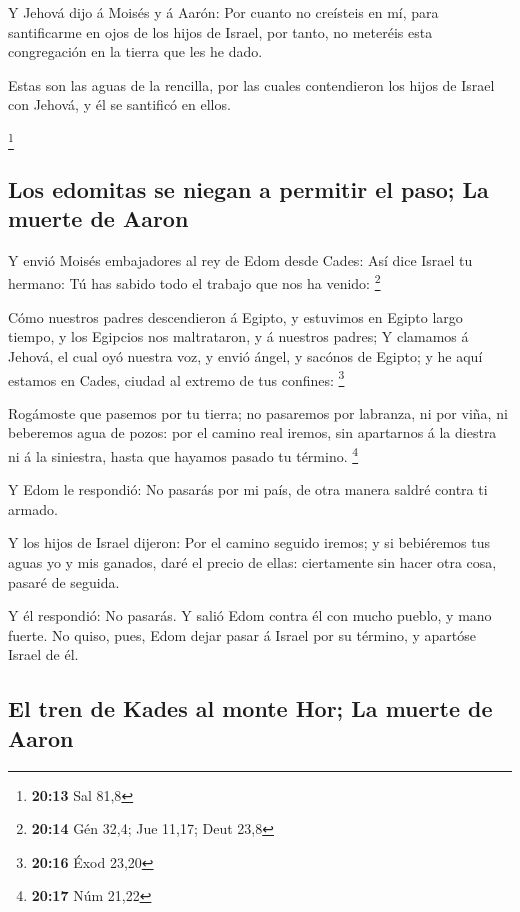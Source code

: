  Y Jehová dijo á Moisés y á Aarón: Por cuanto no
creísteis en mí, para santificarme en ojos de los hijos de Israel, por
tanto, no meteréis esta congregación en la tierra que les he dado.

 Estas son las aguas de la rencilla, por las cuales
contendieron los hijos de Israel con Jehová, y él se santificó en ellos.

\footnote{\textbf{20:13} Sal 81,8}

\hypertarget{los-edomitas-se-niegan-a-permitir-el-paso-la-muerte-de-aaron}{%
\subsection{Los edomitas se niegan a permitir el paso; La muerte de
Aaron}\label{los-edomitas-se-niegan-a-permitir-el-paso-la-muerte-de-aaron}}

 Y envió Moisés embajadores al rey de Edom desde Cades:
Así dice Israel tu hermano: Tú has sabido todo el trabajo que nos ha
venido: \footnote{\textbf{20:14} Gén 32,4; Jue 11,17; Deut 23,8}

 Cómo nuestros padres descendieron á Egipto, y estuvimos
en Egipto largo tiempo, y los Egipcios nos maltrataron, y á nuestros
padres;  Y clamamos á Jehová, el cual oyó nuestra voz, y
envió ángel, y sacónos de Egipto; y he aquí estamos en Cades, ciudad al
extremo de tus confines: \footnote{\textbf{20:16} Éxod 23,20}

 Rogámoste que pasemos por tu tierra; no pasaremos por
labranza, ni por viña, ni beberemos agua de pozos: por el camino real
iremos, sin apartarnos á la diestra ni á la siniestra, hasta que hayamos
pasado tu término. \footnote{\textbf{20:17} Núm 21,22}

 Y Edom le respondió: No pasarás por mi país, de otra
manera saldré contra ti armado.

 Y los hijos de Israel dijeron: Por el camino seguido
iremos; y si bebiéremos tus aguas yo y mis ganados, daré el precio de
ellas: ciertamente sin hacer otra cosa, pasaré de seguida.

 Y él respondió: No pasarás. Y salió Edom contra él con
mucho pueblo, y mano fuerte.  No quiso, pues, Edom dejar
pasar á Israel por su término, y apartóse Israel de él.

\hypertarget{el-tren-de-kades-al-monte-hor-la-muerte-de-aaron}{%
\subsection{El tren de Kades al monte Hor; La muerte de
Aaron}\label{el-tren-de-kades-al-monte-hor-la-muerte-de-aaron}}

